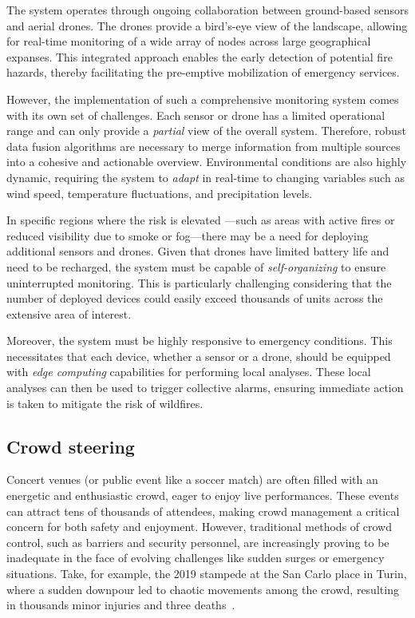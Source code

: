 The system operates through ongoing collaboration between ground-based sensors and aerial drones. 
 The drones provide a bird's-eye view of the landscape, 
 allowing for real-time monitoring of a wide array of nodes across large geographical expanses. 
 This integrated approach enables the early detection of potential fire hazards, 
 thereby facilitating the pre-emptive mobilization of emergency services.

However, the implementation of such a comprehensive monitoring system comes with its own set of challenges. 
 Each sensor or drone has a limited operational range and can only provide a \emph{partial} view of the overall system. 
 Therefore, robust data fusion algorithms are necessary to merge information from multiple sources into a cohesive and actionable overview. 
 Environmental conditions are also highly dynamic, requiring the system to \emph{adapt} in real-time to changing variables such as wind speed, temperature fluctuations, and precipitation levels.

In specific regions where the risk is elevated
 ---such as areas with active fires or reduced visibility due to smoke or fog---there may be a need for deploying additional sensors and drones. 
 Given that drones have limited battery life and need to be recharged, 
 the system must be capable of \emph{self-organizing} to ensure uninterrupted monitoring. 
 This is particularly challenging considering that the number of deployed devices could easily exceed thousands of units across the extensive area of interest.

Moreover, the system must be highly responsive to emergency conditions. 
 This necessitates that each device, whether a sensor or a drone, 
 should be equipped with \emph{edge computing} capabilities for performing local analyses. 
 These local analyses can then be used to trigger collective alarms, 
 ensuring immediate action is taken to mitigate the risk of wildfires.
\subsection{Crowd steering}
Concert venues (or public event like a soccer match) 
 are often filled with an energetic and enthusiastic crowd, 
 eager to enjoy live performances. 
 These events can attract tens of thousands of attendees, 
 making crowd management a critical concern for both safety and enjoyment. 
% 
However, traditional methods of crowd control, 
 such as barriers and security personnel, 
 are increasingly proving to be inadequate in the face of evolving challenges like sudden surges or emergency situations. 
 Take, for example, the 2019 stampede at the San Carlo place in Turin, 
 where a sudden downpour led to chaotic movements among the crowd, 
 resulting in thousands minor injuries and three deaths~\cite{enwiki:1164182872}.

